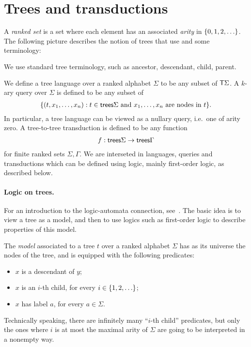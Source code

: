 \section{Trees and transductions}
\label{sec:trees-transductions}
A \emph{ranked set} is a set where each element has an associated \emph{arity} in $\{0,1,2,\ldots\}$. The following picture describes the notion of trees that use and some terminology:

We use standard tree terminology, such as ancestor, descendant, child, parent. 

We define a tree language over a ranked alphabet $\Sigma$ to be any subset of $\mathsf T \Sigma$. A $k$-ary query over $\Sigma$ is defined to be any subset of 
\begin{align*}
    \{(t,x_1,\ldots,x_n) : t \in \mathsf {trees} \Sigma \text{ and $x_1,\ldots,x_n$ are nodes in $t$}\}.
\end{align*}
In particular, a tree language can be viewed as a nullary query, i.e.~one of arity zero.  A tree-to-tree transduction is defined to be any function
\begin{align*}
    f : \mathsf {trees} \Sigma \to \mathsf {trees} \Gamma
\end{align*}
for finite ranked sets $\Sigma, \Gamma$. We are interseted in languages, queries and transductions which can be defined using logic, mainly first-order logic, as described below.

  
\paragraph*{Logic on trees.} For an introduction to the  logic-automata connection, see~\cite{thomas1997languages}. The basic idea is to view a tree as a model, and then to use logics such as first-order logic to describe properties of this model.

\begin{definition}\label{def:tree-model}
    The \emph{model} associated to a  tree $t$ over a ranked alphabet $\Sigma$ has as its universe the nodes of the tree, and is equipped with the following predicates:
    \begin{itemize}
        \item $x$ is a descendant of $y$;
        \item $x$ is an $i$-th child, for every $i \in \{1,2,\ldots\}$;
        \item $x$ has label $a$, for every $a \in \Sigma$.
    \end{itemize}        
\end{definition}
Technically speaking, there are infinitely many ``$i$-th child'' predicates, but only the ones where $i$ is at most the maximal arity of $\Sigma$ are going to be interpreted in a nonempty way.

